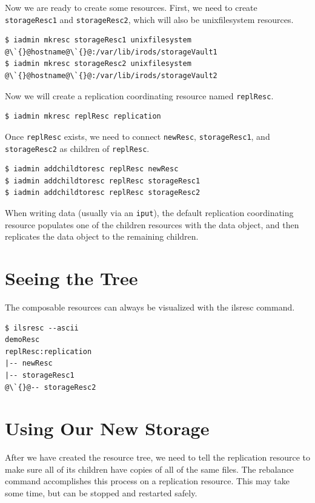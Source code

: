 \documentclass[10pt,oneside]{memoir}
\begin{document}
Now we are ready to create some resources. First, we need to create \texttt{storageResc1} and \texttt{storageResc2}, which will also be unixfilesystem resources.

\begin{lstlisting}[basicstyle=\scriptsize\ttfamily]
$ iadmin mkresc storageResc1 unixfilesystem @\`{}@hostname@\`{}@:/var/lib/irods/storageVault1
$ iadmin mkresc storageResc2 unixfilesystem @\`{}@hostname@\`{}@:/var/lib/irods/storageVault2
\end{lstlisting}

Now we will create a replication coordinating resource named \texttt{replResc}.

\begin{lstlisting}
$ iadmin mkresc replResc replication
\end{lstlisting}

Once \texttt{replResc} exists, we need to connect \texttt{newResc}, \texttt{storageResc1}, and \texttt{storageResc2} as children of \texttt{replResc}.

\begin{lstlisting}
$ iadmin addchildtoresc replResc newResc
$ iadmin addchildtoresc replResc storageResc1
$ iadmin addchildtoresc replResc storageResc2
\end{lstlisting}

When writing data (usually via an \texttt{iput}), the default replication coordinating resource populates one of the children resources with the data object, and then replicates the data object to the remaining children.

\section{Seeing the Tree}

The composable resources can always be visualized with the ilsresc command.

\begin{lstlisting}
$ ilsresc --ascii
demoResc
replResc:replication
|-- newResc
|-- storageResc1
@\`{}@-- storageResc2
\end{lstlisting}

\section{Using Our New Storage}

After we have created the resource tree, we need to tell the replication resource to make sure all of its children have copies of all of the same files. The rebalance command accomplishes this process on a replication resource. This may take some time, but can be stopped and restarted safely.
\end{document}
